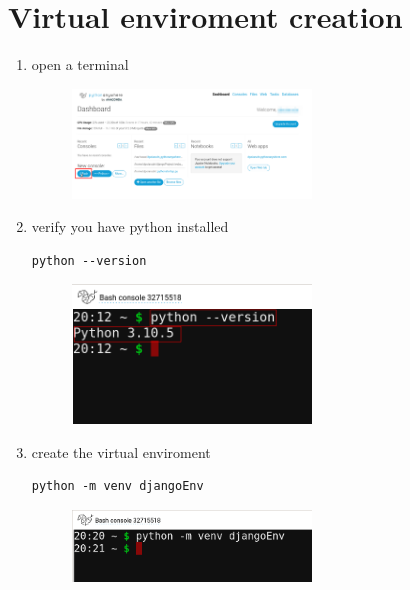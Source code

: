 \documentclass[12pt]{article}
\begin{document}
\section{Virtual enviroment creation}

	\begin{enumerate}
    \item open a terminal
	\begin{figure}[H]
		\centering
		\includegraphics[width=0.6\textwidth ,keepaspectratio]{imgs/open_terminal.png}
		\caption{}
	\end{figure}

    \item verify you have python installed
			\begin{lstlisting}[caption=\phantom{},style=conlst,label={lst:enter_desktop}]
      python --version
			\end{lstlisting}
	\begin{figure}[H]
		\centering
		\includegraphics[width=0.6\textwidth ,keepaspectratio]{imgs/verify_py_version.png}
		\caption{}
	\end{figure}

    \item create the virtual enviroment
			\begin{lstlisting}[caption=\phantom{},style=conlst,label={lst:enter_desktop}]
python -m venv djangoEnv
			\end{lstlisting}
	\begin{figure}[H]
		\centering
		\includegraphics[width=0.6\textwidth ,keepaspectratio]{imgs/create_venv.png}
		\caption{}
	\end{figure}


\end{enumerate}
\end{document}
